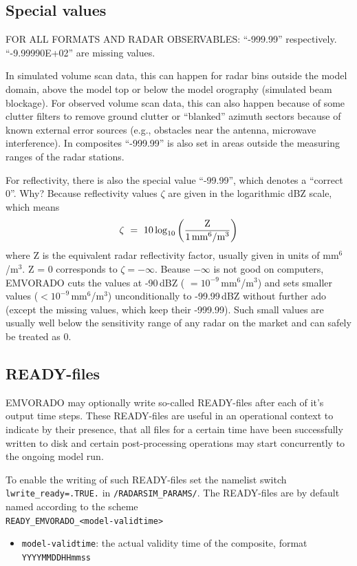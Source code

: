 \documentclass[10pt,a4paper,twoside,headinclude,footinclude,parskip=half]{scrartcl}
\newcommand{\myaktuellesection}{sec:intro}%
\newcommand{\labelsec}[1]{\label{#1}\renewcommand{\myaktuellesection}{#1}}%
\newcommand{\labelsec}[1]{\label{#1}}%
\newcommand{\srcform}[1]{\mbox{\texttt{#1}}\xspace}%
\newcommand{\paramform}[1]{\mbox{\texttt{#1}}\xspace}%
\begin{document}
\subsection{Special values}
\labelsec{sec:output:special}

FOR ALL FORMATS AND RADAR OBSERVABLES:  ``-999.99'' respectively. ``-9.99990E+02'' are missing values.

In simulated volume scan data, this can happen for radar bins outside the model domain, above the model top or below
the model orography (simulated beam blockage). For observed volume scan data, this can also happen
because of some clutter filters to remove ground clutter or ``blanked'' azimuth sectors because of known
external error sources (e.g., obstacles near the antenna, microwave interference).
In composites ``-999.99'' is also set in areas outside the measuring ranges of the radar stations.

For reflectivity, there is also the special value ``-99.99'', which denotes a ``correct 0''.
Why?
Because reflectivity values $\zeta$ are given in the logarithmic dBZ scale,
which means
\begin{equation*}
\zeta\ =\ 10\log_{10}\left(\dfrac{\textnormal{Z}}{1\,\textnormal{mm$^6$/m$^3$}}\right)
\end{equation*}
where Z is the equivalent radar reflectivity factor, usually given in units of mm$^6$/m$^3$.
Z = 0 corresponds to $\zeta = -\infty$.
Beause $-\infty$ is not good on computers, EMVORADO cuts the values at -90\,dBZ ( $=10^{-9}$\,mm$^6$/m$^3$)
and sets smaller values ($< 10^{-9}$\,mm$^6$/m$^3$) unconditionally to -99.99\,dBZ without further ado (except
the missing values, which keep their -999.99). Such small values
are usually well below the sensitivity range of any radar on the market
and can safely be treated as 0.


\subsection{READY-files}
\labelsec{sec:output:ready}

EMVORADO may optionally write so-called READY-files after each of it's output time steps.
These READY-files are useful in an operational context to indicate by their presence, that all files for a certain time
have been successfully written to disk and certain post-processing operations may start
concurrently to the ongoing model run.

To enable the writing of such READY-files set the namelist switch \paramform{lwrite_ready=.TRUE.} in \srcform{/RADARSIM_PARAMS/}. The READY-files are by default named according to the scheme\\[0.5em]
\verb|READY_EMVORADO_<model-validtime>|
\begin{itemize}
\item \verb|model-validtime|: the actual validity time of the composite, format \verb|YYYYMMDDHHmmss|
\end{itemize}
\end{document}
